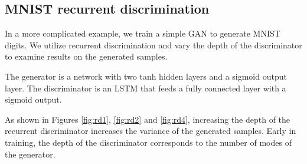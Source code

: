 \documentclass{article}
\begin{document}
\subsection{MNIST recurrent discrimination}
In a more complicated example, we train a simple GAN to generate MNIST digits. We utilize recurrent discrimination and vary the depth of the discriminator to examine results on the generated samples.

The generator is a network with two tanh hidden layers and a sigmoid output layer. The discriminator is an LSTM that feeds a fully connected layer with a sigmoid output.

As shown in Figures \ref{fig:rd1}, \ref{fig:rd2} and \ref{fig:rd4}, increasing the depth of the recurrent discriminator increases the variance of the generated samples. Early in training, the depth of the discriminator corresponds to the number of modes of the generator.
\end{document}
